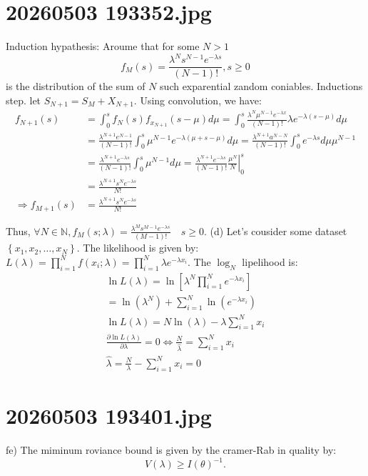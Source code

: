\documentclass[12pt,a4paper]{article}
\begin{document}
\bigskip
\section*{20260503 193352.jpg}
Induction hypathesis:
Aroume that for some $N>1$
$$f_{M}(s)=\frac{\lambda^{N} s^{N-1} e^{-\lambda s}}{(N-1)!}, s \geqslant 0$$
is the distribution of the sum of $N$ such exparential zandom coniables. Inductions step.
let $S_{N+1}=S_{M}+X_{N+1}$. Using convolution, we have:
$$\begin{aligned}
f_{N+1}(s) & =\int_{0}^{s} f_{N}(s) f_{x_{N+1}}(s-\mu) d \mu=\int_{0}^{s} \frac{\lambda^{N} \mu^{N-1} e^{-\lambda x}}{(N-1)!} \lambda e^{-\lambda(s-\mu)} d \mu \\
& =\frac{\lambda^{N+1} e^{N-1}}{(N-1)!} \int_{0}^{s} \mu^{N-1} e^{-\lambda(\mu+s-\mu)} d \mu=\frac{\lambda^{N+1} a^{N-N}}{(N-1)!} \int_{0}^{s} e^{-\lambda s} d \mu \mu^{N-1} \\
& =\frac{\lambda^{N+1} e^{-\lambda s}}{(N-1)!} \int_{0}^{s} \mu^{N-1} d \mu=\left.\frac{\lambda^{N+1} e^{-\lambda s}}{(N-1)!} \frac{\mu^{N}}{N}\right|_{0} ^{s} \\
& =\frac{\lambda^{N+1} s^{N} e^{-\lambda s}}{N!} \\
\Rightarrow f_{M+1}(s) & =\frac{\lambda^{N+1} s^{N} e^{-\lambda s}}{N!}
\end{aligned}$$

Thus, $\forall N \in \mathbb{N}, f_{M}(s ; \lambda)=\frac{\lambda^{M} s^{M-1} e^{-\lambda s}}{(M-1)!} \quad s \geq 0$.
(d) Let's cousider some dataset $\left\{x_{1}, x_{2}, \ldots, x_{N}\right\}$. The likelihood is given by: $L(\lambda)=\prod_{i=1}^{N} f\left(x_{i} ; \lambda\right)=\prod_{i=1}^{N} \lambda e^{-\lambda x_{i}}$. The $\log _{N}$ lipelihood is:
$$\begin{array}{l} 
\ln L(\lambda)=\ln \left[\lambda^{N} \prod_{i=1}^{N} e^{-\lambda x_{i}}\right] \\
=\ln \left(\lambda^{N}\right)+\sum_{i=1}^{N} \ln \left(e^{-\lambda x_{i}}\right) \\
\ln L(\lambda)=N \ln (\lambda)-\lambda \sum_{i=1}^{N} x_{i} \\
\frac{\partial \ln L(\lambda)}{\partial \lambda}=0 \Leftrightarrow \frac{N}{\hat{\lambda}}=\sum_{i=1}^{N} x_{i} \\
\hat{\lambda}=\frac{N}{\lambda}-\sum_{i=1}^{N} x_{i}=0
\end{array}$$

\bigskip
\section*{20260503 193401.jpg}
fe) The miminum roviance bound is given by the cramer-Rab in quality by:
$$V(\lambda) \geqslant I(\theta)^{-1} .$$
\end{document}
